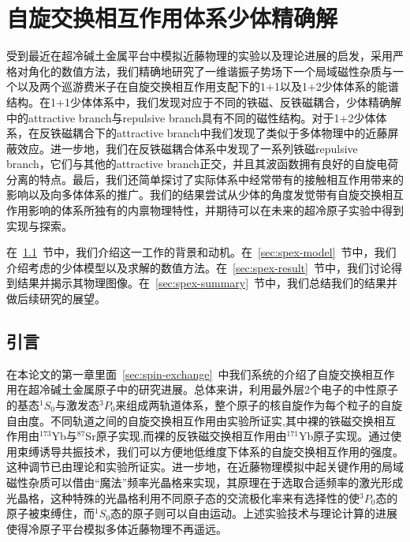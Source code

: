 \chapter{自旋交换相互作用体系少体精确解}\label{chap:kondo}

受到最近在超冷碱土金属平台中模拟近藤物理的实验以及理论进展的启发，采用严格对角化的数值方法，我们精确地研究了一维谐振子势场下一个局域磁性杂质与一个以及两个巡游费米子在自旋交换相互作用支配下的1+1以及1+2少体体系的能谱结构。在1+1少体体系中，我们发现对应于不同的铁磁、反铁磁耦合，少体精确解中的attractive branch与repulsive branch具有不同的磁性结构。对于1+2少体体系，在反铁磁耦合下的attractive branch中我们发现了类似于多体物理中的近藤屏蔽效应。进一步地，我们在反铁磁耦合体系中发现了一系列铁磁repulsive branch，它们与其他的attractive branch正交，并且其波函数拥有良好的自旋电荷分离的特点。最后，我们还简单探讨了实际体系中经常带有的接触相互作用带来的影响以及向多体体系的推广。我们的结果尝试从少体的角度发觉带有自旋交换相互作用影响的体系所独有的内禀物理特性，并期待可以在未来的超冷原子实验中得到实现与探索。

在~\ref{sec:spex-intro}~节中，我们介绍这一工作的背景和动机。在~\ref{sec:spex-model}~节中，我们介绍考虑的少体模型以及求解的数值方法。在~\ref{sec:spex-result}~节中，我们讨论得到结果并揭示其物理图像。在~\ref{sec:spex-summary}~节中，我们总结我们的结果并做后续研究的展望。

\section{引言}\label{sec:spex-intro}
在本论文的第一章里面~\ref{sec:spin-exchange}~中我们系统的介绍了自旋交换相互作用在超冷碱土金属原子中的研究进展。总体来讲，利用最外层2个电子的中性原子的基态${}^1S_0$与激发态${}^3P_0$来组成两轨道体系，整个原子的核自旋作为每个粒子的自旋自由度。不同轨道之间的自旋交换相互作用由实验所证实,其中裸的铁磁交换相互作用由${}^{173}$Yb\cite{scazza2014observation,cappellini2014direct,pagano2015strongly,hofer2015observation}与${}^{87}$Sr\cite{zhang2014spectroscopic}原子实现,而裸的反铁磁交换相互作用由${}^{171}$Yb\cite{ono2019antiferromagnetic}原子实现。通过使用束缚诱导共振技术，我们可以方便地低维度下体系的自旋交换相互作用的强度。这种调节已由理论和实验所证实\cite{zhang2016kondo,cheng2017enhancing,zhang2018control,ji2018confinement,zhang2020tight,zhang2020controlling,riegger2018localized}。进一步地，在近藤物理模拟中起关键作用的局域磁性杂质可以借由“魔法”频率光晶格来实现，其原理在于选取合适频率的激光形成光晶格，这种特殊的光晶格利用不同原子态的交流极化率来有选择性的使${}^3P_0$态的原子被束缚住，而${}^1S_0$态的原子则可以自由运动\cite{riegger2018localized,barber2008optical}。上述实验技术与理论计算的进展使得冷原子平台模拟多体近藤物理不再遥远。

